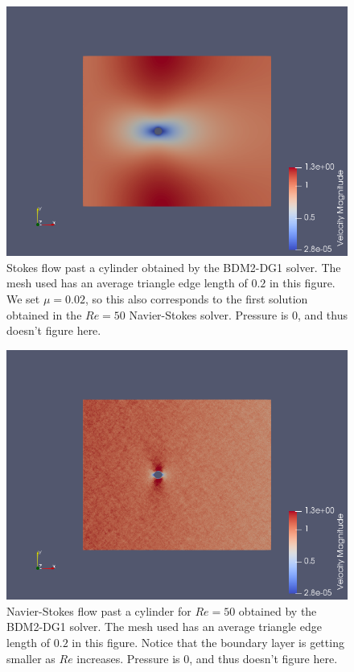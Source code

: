 \documentclass[11pt,twoside,a4paper]{article}
\begin{document}
\begin{figure}
  \includegraphics[width=\linewidth]{scR50.png}
  \caption{Stokes flow past a cylinder obtained by the BDM2-DG1 solver. The mesh used has an average triangle edge length of $0.2$ in this figure. We set $\mu = 0.02$, so this also corresponds to the first solution obtained in the $Re =50$ Navier-Stokes solver. Pressure is $0$, and thus doesn't figure here.}
\end{figure}

\begin{figure}
  \includegraphics[width=\linewidth]{nscR50.png}
  \caption{Navier-Stokes flow past a cylinder for $Re = 50$ obtained by the BDM2-DG1 solver. The mesh used has an average triangle edge length of $0.2$ in this figure. Notice that the boundary layer is getting smaller as $Re$ increases. Pressure is $0$, and thus doesn't figure here.}
\end{figure}
\end{document}
